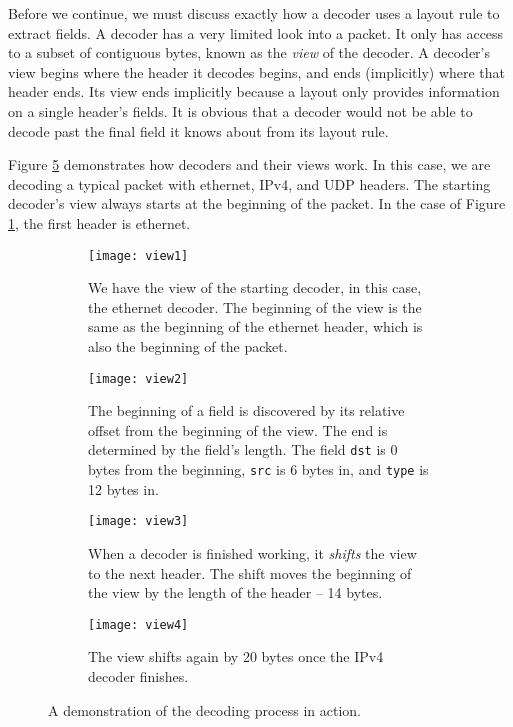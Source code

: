 Before we continue, we must discuss exactly how a decoder uses a layout rule to extract fields. A decoder has a very limited look into a packet. It only has access to a subset of contiguous bytes, known as the \textit{view} of the decoder. A decoder's view begins where the header it decodes begins, and ends (implicitly) where that header ends. Its view ends implicitly because a layout only provides information on a single header's fields. It is obvious that a decoder would not be able to decode past the final field it knows about from its layout rule.

Figure \ref{fg:decoding} demonstrates how decoders and their views work. In this case, we are decoding a typical packet with ethernet, IPv4, and UDP headers. The starting decoder's view always starts at the beginning of the packet. In the case of Figure \ref{fg:view1}, the first header is ethernet.

\begin{figure}[ht]
\begin{subfigure}[t]{.45\textwidth}
  \centering
  \texttt{[image: view1]}
  \caption{We have the view of the starting decoder, in this case, the ethernet decoder. The beginning of the view is the same as the beginning of the ethernet header, which is also the beginning of the packet.}
  \label{fg:view1}
\end{subfigure}%
\hfill
\begin{subfigure}[t]{.45\textwidth}
  \centering
  \texttt{[image: view2]}
  \caption{The beginning of a field is discovered by its relative offset from the beginning of the view. The end is determined by the field's length. The field \texttt{dst} is 0 bytes from the beginning, \texttt{src} is 6 bytes in, and \texttt{type} is 12 bytes in.}
  \label{fg:view2}
\end{subfigure}

\begin{subfigure}[t]{.45\textwidth}
  \centering
  \texttt{[image: view3]}
  \caption{When a decoder is finished working, it \textit{shifts} the view to the next header. The shift moves the beginning of the view by the length of the header -- 14 bytes.}
  \label{fg:view3}
\end{subfigure}%
\hfill
\begin{subfigure}[t]{.45\textwidth}
  \centering
  \texttt{[image: view4]}
  \caption{The view shifts again by 20 bytes once the IPv4 decoder finishes.}
  \label{fg:view4}
\end{subfigure}
\caption{A demonstration of the decoding process in action.}
\label{fg:decoding}
\end{figure}

